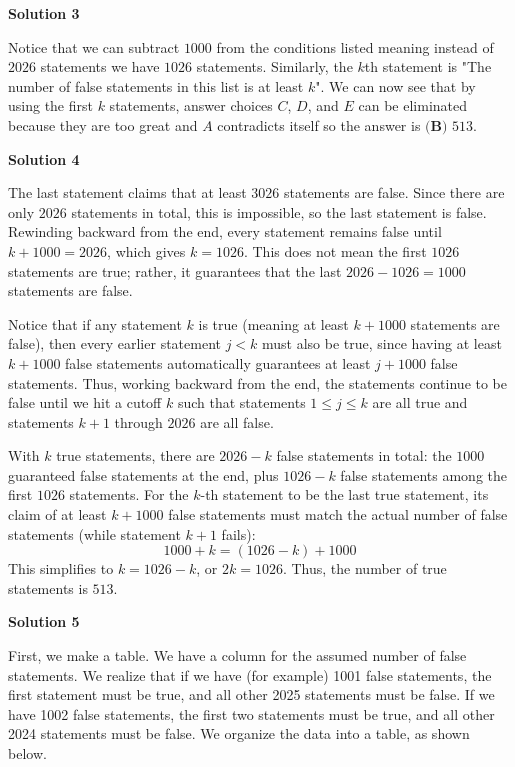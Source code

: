 \begin{enumerate}
 



\textbf{Solution 3}

Notice that we can subtract $1000$ from the conditions listed meaning instead of $2026$ statements we have $1026$ statements. Similarly, the $k$th statement is "The number of false statements in this list is at least $k$". We can now see that by using the first $k$ statements, answer choices $C$, $D$, and $E$ can be eliminated because they are too great and $A$ contradicts itself so the answer is $\boxed{\textbf{(B) } 513}$.

 



\textbf{Solution 4}

The last statement claims that at least $3026$ statements are false. Since there are only $2026$ statements in total, this is impossible, so the last statement is false. Rewinding backward from the end, every statement remains false until $k + 1000 = 2026$, which gives $k = 1026$. This does not mean the first $1026$ statements are true; rather, it guarantees that the last $2026 - 1026 = 1000$ statements are false.

 Notice that if any statement $k$ is true (meaning at least $k + 1000$ statements are false), then every earlier statement $j < k$ must also be true, since having at least $k + 1000$ false statements automatically guarantees at least $j + 1000$ false statements. Thus, working backward from the end, the statements continue to be false until we hit a cutoff $k$ such that statements $1 \leq j \leq k$ are all true and statements $k+1$ through $2026$ are all false.

 With $k$ true statements, there are $2026 - k$ false statements in total: the $1000$ guaranteed false statements at the end, plus $1026 - k$ false statements among the first $1026$ statements. For the $k$-th statement to be the last true statement, its claim of at least $k + 1000$ false statements must match the actual number of false statements (while statement $k+1$ fails):
 \[1000 + k = (1026 - k) + 1000\]This simplifies to $k = 1026 - k$, or $2k = 1026$. Thus, the number of true statements is $\boxed{513}$.

 



\textbf{Solution 5}

First, we make a table. We have a column for the assumed number of false statements. We realize that if we have (for example) 1001 false statements, the first statement must be true, and all other 2025 statements must be false. If we have 1002 false statements, the first two statements must be true, and all other 2024 statements must be false. We organize the data into a table, as shown below.


\end{enumerate}
